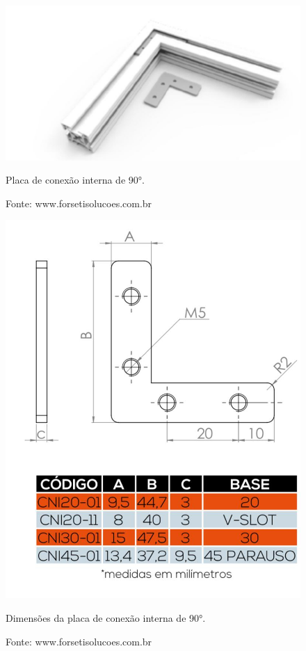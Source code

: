 \begin{figure}[H]
\centering
\includegraphics[scale = 0.4]{figuras/pconexao90p}
\caption{Placa de conexão interna de 90°.}
\caption*{Fonte: www.forsetisolucoes.com.br}
\label{fig:pconexao90p}
\end{figure}
    
\begin{figure}[H]
\centering
\includegraphics[scale = 0.4]{figuras/pconexao90d}
\caption{Dimensões da placa de conexão interna de 90°.}
\caption*{Fonte: www.forsetisolucoes.com.br}
\label{fig:pconexao90d}
\end{figure}

